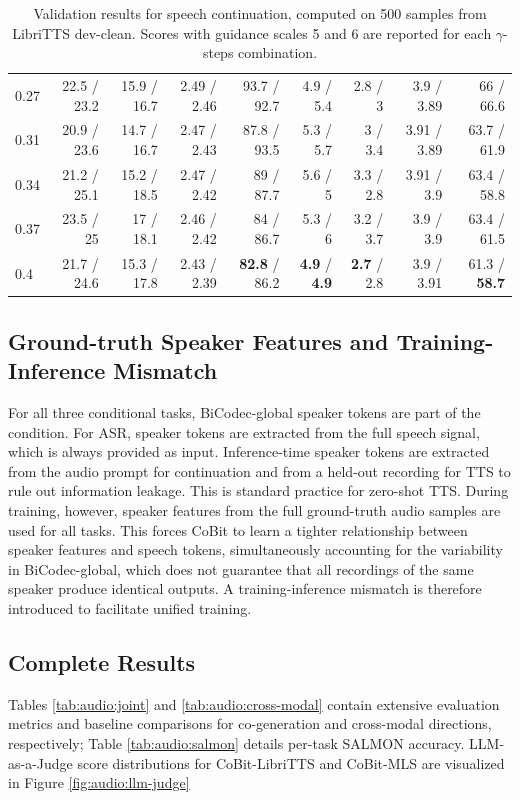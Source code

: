 \begin{table}[t]
\begin{tabular}{l rrrrrrrr}
0.27 & 22.5 / 23.2 & 15.9 / 16.7 & 2.49 / 2.46 & 93.7 / 92.7 & 4.9 / 5.4 & 2.8 / 3 & 3.9 / 3.89 & 66 / 66.6 \\
0.31 & 20.9 / 23.6 & 14.7 / 16.7 & 2.47 / 2.43 & 87.8 / 93.5 & 5.3 / 5.7 & 3 / 3.4 & 3.91 / 3.89 & 63.7 / 61.9 \\
0.34 & 21.2 / 25.1 & 15.2 / 18.5 & 2.47 / 2.42 & 89 / 87.7 & 5.6 / 5 & 3.3 / 2.8 & 3.91 / 3.9 & 63.4 / 58.8 \\
0.37 & 23.5 / 25 & 17 / 18.1 & 2.46 / 2.42 & 84 / 86.7 & 5.3 / 6 & 3.2 / 3.7 & 3.9 / 3.9 & 63.4 / 61.5 \\
0.4 & 21.7 / 24.6 & 15.3 / 17.8 & 2.43 / 2.39 & \textbf{82.8} / 86.2 & \textbf{4.9} / \textbf{4.9} & \textbf{2.7} / 2.8 & 3.9 / 3.91 & 61.3 / \textbf{58.7} \\
\bottomrule
\end{tabular}
\caption{Validation results for speech continuation, computed on 500 samples from LibriTTS dev-clean. Scores with guidance scales 5 and 6 are reported for each $\gamma$-steps combination.}
\label{tab:audio:val:cont}
\end{table}

\subsection{Ground-truth Speaker Features and Training-Inference Mismatch}

For all three conditional tasks, BiCodec-global speaker tokens are part of the condition. For ASR, speaker tokens are extracted from the full speech signal, which is always provided as input. Inference-time speaker tokens are extracted from the audio prompt for continuation and from a held-out recording for TTS to rule out information leakage. This is standard practice for zero-shot TTS. During training, however, speaker features from the full ground-truth audio samples are used for all tasks. This forces CoBit to learn a tighter relationship between speaker features and speech tokens, simultaneously accounting for the variability in BiCodec-global, which does not guarantee that all recordings of the same speaker produce identical outputs. A training-inference mismatch is therefore introduced to facilitate unified training.

\subsection{Complete Results}

Tables \ref{tab:audio:joint} and \ref{tab:audio:cross-modal} contain extensive evaluation metrics and baseline comparisons for co-generation and cross-modal directions, respectively; Table \ref{tab:audio:salmon} details per-task SALMON accuracy. LLM-as-a-Judge score distributions for CoBit-LibriTTS and CoBit-MLS are visualized in Figure \ref{fig:audio:llm-judge}

